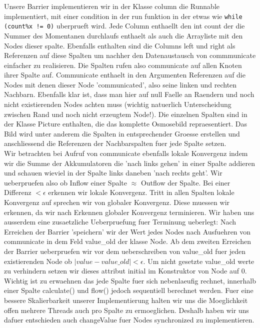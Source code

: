 \documentclass[12pt]{article}
\begin{document}
Unsere Barrier implementieren wir in der Klasse column die Runnable implementiert, mit einer condition in der run funktion in der etwas wie \verb+while (count%x != 0)+ uberprueft wird. Jede Column enthaellt den int count der die Nummer des Momentanen durchlaufs enthaelt als auch die Arrayliste mit den Nodes dieser spalte. Ebenfalls enthalten sind die Columns left und right als Referenzen auf diese Spalten um nachher den Datenaustausch von commmunicate einfacher zu realisieren. Die Spalten rufen also communicate auf allen Knoten ihrer Spalte auf. Communicate enthaelt in den Argumenten Referenzen auf die Nodes mit denen dieser Node 'communicated', also seine linken und rechten Nachbarn. Ebenfalls klar ist, dass man hier auf null Faelle an Raendern und noch nicht existierenden Nodes achten muss (wichtig natuerlich Unterscheidung zwischen Rand und noch nicht erzeugtem Node!). Die einzelnen Spalten sind in der Klasse Picture enthalten, die das komplette Osmosebild repraesentiert. Das Bild wird unter anderem die Spalten in entsprechender Groesse erstellen und anschliessend die Referenzen der Nachbarspalten fuer jede Spalte setzen.\\
Wir betrachten bei Aufruf von communicate ebenfalls lokale Konvergenz indem wir die Summe der Akkumulatoren die 'nach links gehen' in einer Spalte addieren und schauen wieviel in der Spalte links daneben 'nach rechts geht'. Wir ueberpruefen also ob Inflow einer Spalte $\approx$ Outflow der Spalte. Bei einer Differenz $< \epsilon$ erkennen wir lokale Konvergenz. Tritt in allen Spalten lokale Konvergenz auf sprechen wir von globaler Konvergenz. Diese muessen wir erkennen, da wir nach Erkennen globaler Konvergenz terminieren. Wir haben uns ausserdem eine zusaetzliche Ueberpruefung fuer Terminung ueberlegt: Nach Erreichen der Barrier 'speichern' wir der Wert jedes Nodes nach Ausfuehren von communicate in dem Feld value\_old der klasse Node. Ab dem zweiten Erreichen der Barrier ueberpruefen wir vor dem ueberschreiben von value\_old fuer jeden existierenden Node ob $|value-value\_old| < \epsilon$. Um nicht gesetzte value\_old werte zu verhindern setzen wir dieses attribut initial im Konstruktor von Node auf 0.\\
Wichtig ist zu erwaehnen das jede Spalte fuer sich nebenlaeufig rechnet, innerhalb einer Spalte calculate() und flow() jedoch sequentiell berechnet werden. Fuer eine bessere Skalierbarkeit unserer Implementierung halten wir uns die Moeglichkeit offen mehrere Threads auch pro Spalte zu ermoeglichen. Deshalb haben wir uns dafuer entschieden auch changeValue fuer Nodes synchronized zu implementieren.\\





\end{document}
